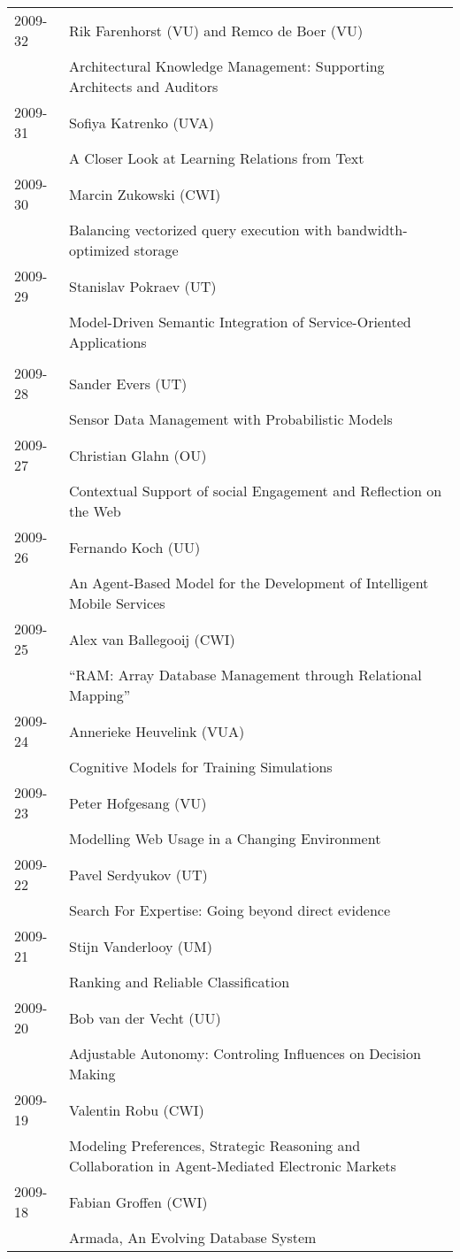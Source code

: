 \begin{longtable}{p{1.25cm}p{10.75cm}}
2009-32 & Rik Farenhorst (VU) and Remco de Boer (VU) \\& Architectural Knowledge Management: Supporting Architects and Auditors \\
2009-31 & Sofiya Katrenko (UVA) \\& A Closer Look at Learning Relations from Text \\
2009-30 & Marcin Zukowski (CWI) \\& Balancing vectorized query execution with bandwidth-optimized storage \\
2009-29 & Stanislav Pokraev (UT) \\& Model-Driven Semantic Integration of Service-Oriented Applications \\
\\
2009-28 & Sander Evers (UT) \\& Sensor Data Management with Probabilistic Models \\
2009-27 & Christian Glahn (OU) \\& Contextual Support of social Engagement and Reflection on the Web \\
2009-26 & Fernando Koch (UU) \\& An Agent-Based Model for the Development of Intelligent Mobile Services \\
2009-25 & Alex van Ballegooij (CWI) \\& “RAM: Array Database Management through Relational Mapping” \\
2009-24 & Annerieke Heuvelink (VUA) \\& Cognitive Models for Training Simulations \\
2009-23 & Peter Hofgesang (VU) \\& Modelling Web Usage in a Changing Environment \\
2009-22 & Pavel Serdyukov (UT) \\& Search For Expertise: Going beyond direct evidence \\
2009-21 & Stijn Vanderlooy (UM) \\& Ranking and Reliable Classification \\
2009-20 & Bob van der Vecht (UU) \\& Adjustable Autonomy: Controling Influences on Decision Making \\
2009-19 & Valentin Robu (CWI) \\& Modeling Preferences, Strategic Reasoning and Collaboration in Agent-Mediated Electronic Markets \\
2009-18 & Fabian Groffen (CWI) \\& Armada, An Evolving Database System \\

\end{longtable}
